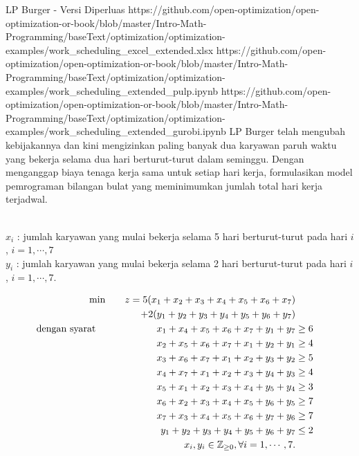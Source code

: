 \newpage
\begin{examplewithallcode}{LP Burger - Versi Diperluas}
{https://github.com/open-optimization/open-optimization-or-book/blob/master/Intro-Math-Programming/baseText/optimization/optimization-examples/work_scheduling_excel_extended.xlsx}
{https://github.com/open-optimization/open-optimization-or-book/blob/master/Intro-Math-Programming/baseText/optimization/optimization-examples/work_scheduling_extended_pulp.ipynb}
{https://github.com/open-optimization/open-optimization-or-book/blob/master/Intro-Math-Programming/baseText/optimization/optimization-examples/work_scheduling_extended_gurobi.ipynb}
LP Burger telah mengubah kebijakannya dan kini mengizinkan paling banyak dua karyawan paruh waktu yang bekerja selama dua hari berturut-turut dalam seminggu. Dengan menganggap biaya tenaga kerja sama untuk setiap hari kerja, formulasikan model pemrograman bilangan bulat yang meminimumkan jumlah total hari kerja terjadwal.
\end{examplewithallcode}
\begin{solution}
 \\
$x_i$ : jumlah karyawan yang mulai bekerja selama 5 hari berturut-turut pada hari $i$, $ i = 1,\cdots,7$ \\
$y_i$ : jumlah karyawan yang mulai bekerja selama 2 hari berturut-turut pada hari $i$, $ i = 1,\cdots,7$.

\smallskip {}
\begin{align*}
\min \quad && z = 5(x_1 + x_2 + x_3 + x_4 + x_5 + x_6 + x_7) \\
&& + 2(y_1 + y_2 + y_3 + y_4 + y_5 + y_6 + y_7) \nonumber \\
\mbox{dengan syarat}\quad \quad && x_1 + x_4 + x_5 + x_6 + x_7 + y_1 + y_7 &\ge 6 \\
&& x_2 + x_5 + x_6 + x_7 + x_1 + y_2 + y_1 &\ge 4 \\
&&           x_3 + x_6 + x_7 + x_1 + x_2 + y_3 + y_2 &\ge 5 \\
&&           x_4 + x_7 + x_1 + x_2 + x_3 + y_4 + y_3 &\ge 4 \\
&&           x_5 + x_1 + x_2 + x_3 + x_4 + y_5 + y_4 &\ge 3 \\
&&           x_6 + x_2 + x_3 + x_4 + x_5 + y_6 + y_5 &\ge 7 \\
&&           x_7 + x_3 + x_4 + x_5 + x_6 + y_7 + y_6 &\ge 7 \\
&&           y_1 + y_2 + y_3 + y_4 + y_5 + y_6 + y_7 &\le 2 \\
&&           x_i, y_i \in \mathbb{Z}_{\ge 0}, \forall i = 1,\cdots,7.
\end{align*}
\end{solution}

